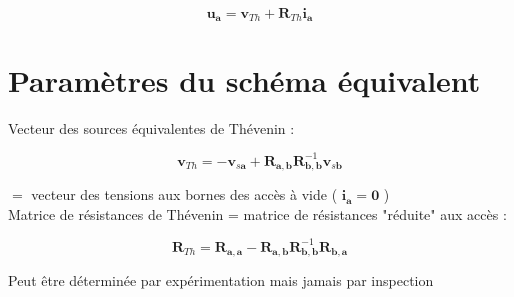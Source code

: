 \documentclass[10pt]{article}
\begin{document}
$$
\mathbf{u}_{\mathbf{a}}=\mathbf{v}_{T h}+\mathbf{R}_{T h} \mathbf{i}_{\mathbf{a}}
$$

\section*{Paramètres du schéma équivalent}
Vecteur des sources équivalentes de Thévenin :

$$
\mathbf{v}_{T h}=-\mathbf{v}_{s \mathbf{a}}+\mathbf{R}_{\mathbf{a}, \mathbf{b}} \mathbf{R}_{\mathbf{b}, \mathbf{b}}^{-1} \mathbf{v}_{s \mathbf{b}}
$$

$=$ vecteur des tensions aux bornes des accès à vide ( $\mathbf{i}_{\mathbf{a}}=\mathbf{0}$ )\\
Matrice de résistances de Thévenin = matrice de résistances "réduite" aux accès :

$$
\mathbf{R}_{T h}=\mathbf{R}_{\mathbf{a}, \mathbf{a}}-\mathbf{R}_{\mathbf{a}, \mathbf{b}} \mathbf{R}_{\mathbf{b}, \mathbf{b}}^{-1} \mathbf{R}_{\mathbf{b}, \mathbf{a}}
$$

Peut être déterminée par expérimentation mais jamais par inspection
\end{document}
